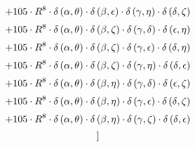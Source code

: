 \begin{subequations}
\begin{gather}
 \\[0.2em] \notag 		 + 105 \cdot R^{8} \cdot \delta{}\left(\alpha{}, \theta{}\right) \cdot \delta{}\left(\beta{}, \epsilon{}\right) \cdot \delta{}\left(\gamma{}, \eta{}\right) \cdot \delta{}\left(\delta{}, \zeta{}\right) 
 \\[0.2em] \notag 		 + 105 \cdot R^{8} \cdot \delta{}\left(\alpha{}, \theta{}\right) \cdot \delta{}\left(\beta{}, \zeta{}\right) \cdot \delta{}\left(\gamma{}, \delta{}\right) \cdot \delta{}\left(\epsilon{}, \eta{}\right) 
 \\[0.2em] \notag 		 + 105 \cdot R^{8} \cdot \delta{}\left(\alpha{}, \theta{}\right) \cdot \delta{}\left(\beta{}, \zeta{}\right) \cdot \delta{}\left(\gamma{}, \epsilon{}\right) \cdot \delta{}\left(\delta{}, \eta{}\right) 
 \\[0.2em] \notag 		 + 105 \cdot R^{8} \cdot \delta{}\left(\alpha{}, \theta{}\right) \cdot \delta{}\left(\beta{}, \zeta{}\right) \cdot \delta{}\left(\gamma{}, \eta{}\right) \cdot \delta{}\left(\delta{}, \epsilon{}\right) 
 \\[0.2em] \notag 		 + 105 \cdot R^{8} \cdot \delta{}\left(\alpha{}, \theta{}\right) \cdot \delta{}\left(\beta{}, \eta{}\right) \cdot \delta{}\left(\gamma{}, \delta{}\right) \cdot \delta{}\left(\epsilon{}, \zeta{}\right) 
 \\[0.2em] \notag 		 + 105 \cdot R^{8} \cdot \delta{}\left(\alpha{}, \theta{}\right) \cdot \delta{}\left(\beta{}, \eta{}\right) \cdot \delta{}\left(\gamma{}, \epsilon{}\right) \cdot \delta{}\left(\delta{}, \zeta{}\right) 
 \\[0.2em] \notag 		 + 105 \cdot R^{8} \cdot \delta{}\left(\alpha{}, \theta{}\right) \cdot \delta{}\left(\beta{}, \eta{}\right) \cdot \delta{}\left(\gamma{}, \zeta{}\right) \cdot \delta{}\left(\delta{}, \epsilon{}\right)\\[0.2em] \notag ]
\end{gather}\end{subequations}